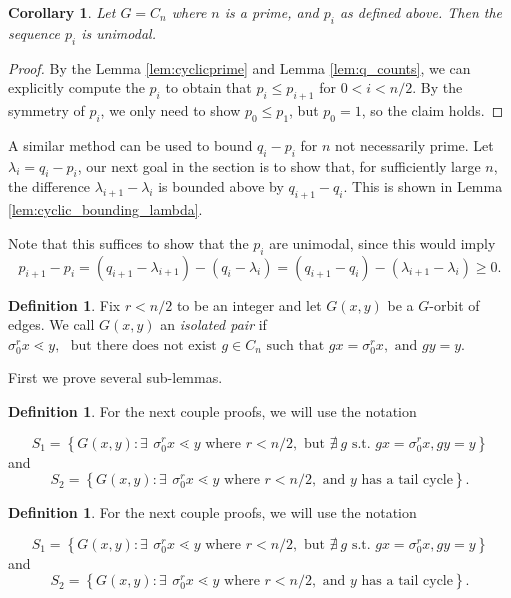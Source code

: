 \documentclass[10 pt]{amsart}
\theoremstyle{plain}
\newtheorem{cor}[thm]{Corollary}
\theoremstyle{definition}
\newtheorem{defn}[thm]{Definition}
\theoremstyle{remark}
\numberwithin{equation}{section}
\begin{document}
\begin{cor}{\label{cor:cyclic_prime_unimodal}} Let $G = C_n$ where $n$ is a prime, and $p_i$ as defined above. Then the sequence $p_i$ is unimodal. 
\end{cor}

\begin{proof}
By the Lemma \ref{lem:cyclicprime} and Lemma \ref{lem:q_counts}, we can explicitly compute the $p_i$ to obtain that $p_i \leq p_{i+1}$ for $0 < i < n/2.$ By the symmetry of $p_i$, we only need to show $p_0 \le p_1$, but $p_0 = 1$, so the claim holds.
\end{proof}

A similar method can be used to bound $q_i - p_i$ for $n$ not necessarily prime. Let $\lambda_i = q_i - p_i$, our next goal in the section is to show that,  for sufficiently large $n$, the difference $\lambda_{i+1} - \lambda_{i}$ is bounded above by  $q_{i+1} - q_i$. This is shown in Lemma \ref{lem:cyclic_bounding_lambda}. 

Note that this suffices to show that the $p_i$ are unimodal, since this would imply $$p_{i+1} - p_{i} = (q_{i+1} - \lambda_{i+1}) - (q_i - \lambda_i) = (q_{i+1} - q_i) - (\lambda_{i+1}- \lambda_i) \ge 0.$$ 


\begin{defn}
Fix $r < n/2$ to be an integer and let $ G(x, y)$ be a $G$-orbit of edges. We call $G(x , y)$ an {\it isolated pair} if  $ \sigma_0^r x \lessdot y, \, \, \text{ but  there does not exist } g \in C_n \text{ such that } g x = \sigma_0 ^r x,  \text{ and }g y = y$. 
\end{defn}

First we prove several sub-lemmas. 

\begin{defn}
For the next couple proofs, we will use the notation

$$S_1 = \left\{G{(x, y)} : \exists \: \, \sigma_0^r x \lessdot y \text{ where } r < n/2, \text{ but } \nexists \:  g \text{ s.t. } g x = \sigma_0 ^r x, g y = y \right\} $$ and $$S_2= \left\{ G(x, y):  \exists \: \, \sigma_0^r x \lessdot y \text{ where } r < n/2,  \text{ and } y \text{ has a tail cycle}  \right\}.$$
\end{defn}



\begin{defn}
For the next couple proofs, we will use the notation

$$S_1 = \left\{G{(x, y)} : \exists \: \, \sigma_0^r x \lessdot y \text{ where } r < n/2, \text{ but } \nexists \:  g \text{ s.t. } g x = \sigma_0 ^r x, g y = y \right\} $$ and $$S_2= \left\{ G(x, y):  \exists \: \, \sigma_0^r x \lessdot y \text{ where } r < n/2,  \text{ and } y \text{ has a tail cycle}  \right\}.$$
\end{defn}
\end{document}
